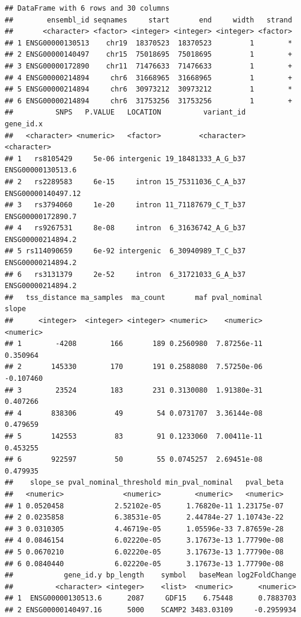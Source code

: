 \documentclass[9pt,a4paper,]{extarticle}
\begin{document}
\begin{verbatim}
## DataFrame with 6 rows and 30 columns
##        ensembl_id seqnames     start       end     width   strand
##       <character> <factor> <integer> <integer> <integer> <factor>
## 1 ENSG00000130513    chr19  18370523  18370523         1        *
## 2 ENSG00000140497    chr15  75018695  75018695         1        +
## 3 ENSG00000172890    chr11  71476633  71476633         1        +
## 4 ENSG00000214894     chr6  31668965  31668965         1        +
## 5 ENSG00000214894     chr6  30973212  30973212         1        *
## 6 ENSG00000214894     chr6  31753256  31753256         1        +
##          SNPS   P.VALUE   LOCATION          variant_id          gene_id.x
##   <character> <numeric>   <factor>         <character>        <character>
## 1   rs8105429     5e-06 intergenic 19_18481333_A_G_b37  ENSG00000130513.6
## 2   rs2289583     6e-15     intron 15_75311036_C_A_b37 ENSG00000140497.12
## 3   rs3794060     1e-20     intron 11_71187679_C_T_b37  ENSG00000172890.7
## 4   rs9267531     8e-08     intron  6_31636742_A_G_b37  ENSG00000214894.2
## 5 rs114090659     6e-92 intergenic  6_30940989_T_C_b37  ENSG00000214894.2
## 6   rs3131379     2e-52     intron  6_31721033_G_A_b37  ENSG00000214894.2
##   tss_distance ma_samples  ma_count       maf pval_nominal     slope
##      <integer>  <integer> <integer> <numeric>    <numeric> <numeric>
## 1        -4208        166       189 0.2560980  7.87256e-11  0.350964
## 2       145330        170       191 0.2588080  7.57250e-06 -0.107460
## 3        23524        183       231 0.3130080  1.91380e-31  0.407266
## 4       838306         49        54 0.0731707  3.36144e-08  0.479659
## 5       142553         83        91 0.1233060  7.00411e-11  0.453255
## 6       922597         50        55 0.0745257  2.69451e-08  0.479935
##    slope_se pval_nominal_threshold min_pval_nominal   pval_beta
##   <numeric>              <numeric>        <numeric>   <numeric>
## 1 0.0520458            2.52102e-05      1.76820e-11 1.23175e-07
## 2 0.0235858            6.38531e-05      2.44784e-27 1.10743e-22
## 3 0.0310305            4.46719e-05      1.05596e-33 7.87659e-28
## 4 0.0846154            6.02220e-05      3.17673e-13 1.77790e-08
## 5 0.0670210            6.02220e-05      3.17673e-13 1.77790e-08
## 6 0.0840440            6.02220e-05      3.17673e-13 1.77790e-08
##            gene_id.y bp_length    symbol   baseMean log2FoldChange
##          <character> <integer>    <list>  <numeric>      <numeric>
## 1  ENSG00000130513.6      2087     GDF15    6.75448      0.7883703
## 2 ENSG00000140497.16      5000    SCAMP2 3483.03109     -0.2959934

\end{verbatim}
\end{document}
